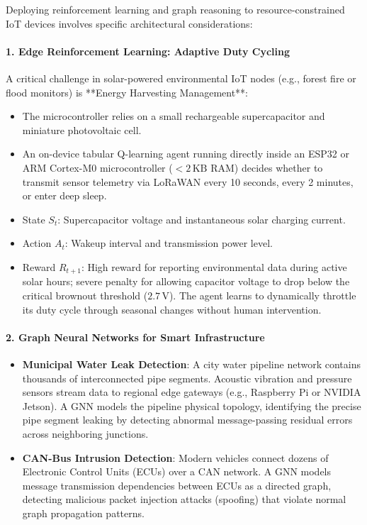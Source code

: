 \begin{iotbox}
Deploying reinforcement learning and graph reasoning to resource-constrained IoT devices involves specific architectural considerations:

\paragraph{1. Edge Reinforcement Learning: Adaptive Duty Cycling}
A critical challenge in solar-powered environmental IoT nodes (e.g., forest fire or flood monitors) is **Energy Harvesting Management**:
\begin{itemize}
    \item The microcontroller relies on a small rechargeable supercapacitor and miniature photovoltaic cell.
    \item An on-device tabular Q-learning agent running directly inside an ESP32 or ARM Cortex-M0 microcontroller ($< 2\,\text{KB}$ RAM) decides whether to transmit sensor telemetry via LoRaWAN every 10 seconds, every 2 minutes, or enter deep sleep.
    \item State $S_t$: Supercapacitor voltage and instantaneous solar charging current.
    \item Action $A_t$: Wakeup interval and transmission power level.
    \item Reward $R_{t+1}$: High reward for reporting environmental data during active solar hours; severe penalty for allowing capacitor voltage to drop below the critical brownout threshold ($2.7\,\text{V}$). The agent learns to dynamically throttle its duty cycle through seasonal changes without human intervention.
\end{itemize}

\paragraph{2. Graph Neural Networks for Smart Infrastructure}
\begin{itemize}
    \item \textbf{Municipal Water Leak Detection}: A city water pipeline network contains thousands of interconnected pipe segments. Acoustic vibration and pressure sensors stream data to regional edge gateways (e.g., Raspberry Pi or NVIDIA Jetson). A GNN models the pipeline physical topology, identifying the precise pipe segment leaking by detecting abnormal message-passing residual errors across neighboring junctions.
    \item \textbf{CAN-Bus Intrusion Detection}: Modern vehicles connect dozens of Electronic Control Units (ECUs) over a CAN network. A GNN models message transmission dependencies between ECUs as a directed graph, detecting malicious packet injection attacks (spoofing) that violate normal graph propagation patterns.
\end{itemize}


\end{iotbox}
